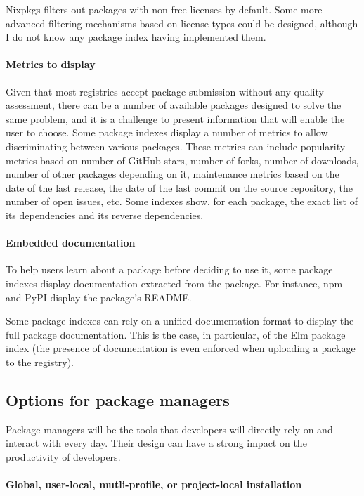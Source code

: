 Nixpkgs filters out packages with non-free licenses by default.
Some more advanced filtering mechanisms based on license types could be designed, although I do not know any package index having implemented them.

\paragraph{Metrics to display}

Given that most registries accept package submission without any quality assessment, there can be a number of available packages designed to solve the same problem, and it is a challenge to present information that will enable the user to choose.
Some package indexes display a number of metrics to allow discriminating between various packages.
These metrics can include popularity metrics based on number of GitHub stars, number of forks, number of downloads, number of other packages depending on it, maintenance metrics based on the date of the last release, the date of the last commit on the source repository, the number of open issues, etc.
Some indexes show, for each package, the exact list of its dependencies and its reverse dependencies.

\paragraph{Embedded documentation}

To help users learn about a package before deciding to use it, some package indexes display documentation extracted from the package.
For instance, npm and PyPI display the package's README.

Some package indexes can rely on a unified documentation format to display the full package documentation.
This is the case, in particular, of the Elm package index (the presence of documentation is even enforced when uploading a package to the registry).

\subsection{Options for package managers}

Package managers will be the tools that developers will directly rely on and interact with every day.
Their design can have a strong impact on the productivity of developers.

\paragraph{Global, user-local, mutli-profile, or project-local installation}

